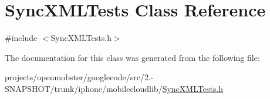 \hypertarget{interface_sync_x_m_l_tests}{
\section{\-Sync\-X\-M\-L\-Tests \-Class \-Reference}
\label{interface_sync_x_m_l_tests}
}


{\ttfamily \#include $<$\-Sync\-X\-M\-L\-Tests.\-h$>$}



\-The documentation for this class was generated from the following file\-:\begin{DoxyCompactItemize}
\item 
projects/openmobster/googlecode/src/2.-\/\-S\-N\-A\-P\-S\-H\-O\-T/trunk/iphone/mobilecloudlib/\hyperlink{_sync_x_m_l_tests_8h}{\-Sync\-X\-M\-L\-Tests.\-h}\end{DoxyCompactItemize}
